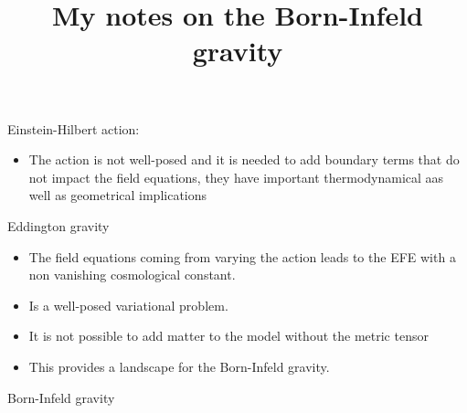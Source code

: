 \documentclass[10pt,a4paper]{article}
\title{My notes on the Born-Infeld gravity}
\begin{document}
Einstein-Hilbert action:
\begin{itemize}
    \item The action is not well-posed and it is needed to add boundary terms that do not impact the field equations,
    they have important thermodynamical aas well as geometrical implications
\end{itemize}

Eddington gravity
\begin{itemize}
    \item The field equations coming from varying the action leads to the EFE with a non vanishing cosmological constant.
    \item Is a well-posed variational problem.
    \item It is not possible to add matter to the model without the metric tensor
    \item This provides a landscape for the Born-Infeld gravity.
\end{itemize}

Born-Infeld gravity
\end{document}
